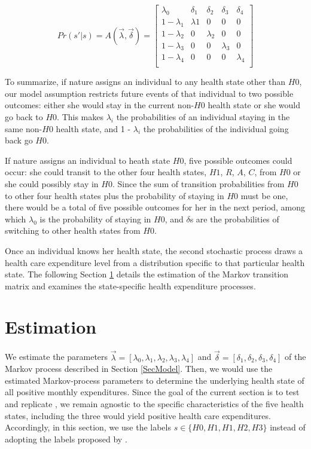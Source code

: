 \documentclass[letterpaper,12pt]{article}
\theoremstyle{definition}
\begin{document}
\begin{spacing}{1.5}{}
  \begin{equation}\label{eq:stochastic_matrix}
    Pr(s' | s) = A(\vec{\lambda}, \vec{\delta}) = 
    \begin{bmatrix}
      \lambda_0 & \delta_1 & \delta_2 & \delta_3  & \delta_4 \\
      1 - \lambda_1 & \lambda1 & 0 & 0  & 0 \\
      1 - \lambda_2 & 0 & \lambda_2 & 0 & 0 \\
      1 - \lambda_3 & 0 & 0 & \lambda_3  & 0\\
      1 - \lambda_4 & 0 & 0 & 0 & \lambda_4\\
    \end{bmatrix}
  \end{equation}
    
    To summarize, if nature assigns an individual to any health state other than $H0$, our model assumption restricts future events of that individual to two possible outcomes: either she would stay in the current non-$H0$ health state or she would go back to $H0$. This makes $\lambda_i$ the probabilities of an individual staying in the same non-$H0$ health state, and 1 - $\lambda_i$ the probabilities of the individual going back go $H0$.
    
    If nature assigns an individual to heath state $H0$, five possible outcomes could occur: she could transit to the other four health states, $H1$, $R$, $A$, $C$, from $H0$ or she could possibly stay in $H0$. Since the sum of transition probabilities from $H0$ to other four health states plus the probability of staying in $H0$ must be one, there would be a total of five possible outcomes for her in the next period, among which $\lambda_0$ is the probability of staying in $H0$, and $\delta$s are the probabilities of switching to other health states from $H0$.
    
    Once an individual knows her health state, the second stochastic process draws a health care expenditure level from a distribution specific to that particular health state. The following Section \ref{SecEstimation} details the estimation of the Markov transition matrix and examines the state-specific health expenditure processes.


\section{Estimation}\label{SecEstimation}

  We estimate the parameters $\vec{\lambda} = [\lambda_0, \lambda_1, \lambda_2, \lambda_3, \lambda_4]$ and $\vec{\delta} = [\delta_1, \delta_2, \delta_3, \delta_4]$ of the Markov process described in Section \ref{SecModel}. Then, we would use the estimated Markov-process parameters to determine the underlying health state of all positive monthly expenditures. Since the goal of the current section is to test and replicate \citet{evans}, we remain agnostic to the specific characteristics of the five health states, including the three would yield positive health care expenditures. Accordingly, in this section, we use the labels $s \in \{H0, H1, H1, H2, H3\}$ instead of adopting the labels proposed by \citet{evans}.\par
  

\end{spacing}
\end{document}
